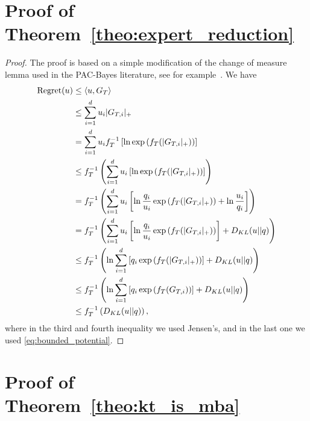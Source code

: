 \section{Proof of Theorem~\ref{theo:expert_reduction}}
\begin{proof}
The proof is based on a simple modification of the change of measure lemma used in the PAC-Bayes literature, see for example~\citet{McAllester13}.
We have
\begin{align*}
\operatorname{Regret}(u) 
& \leq \langle u, G_T \rangle \\
& \leq \sum_{i=1}^d u_i |G_{T,i}|_+ \\
& = \sum_{i=1}^d u_i f_T^{-1}\left[\ln \exp\left(f_T(|G_{T,i}|_+)\right)\right] \\
& \leq f_T^{-1}\left(\sum_{i=1}^d u_i \left[\ln \exp\left(f_T(|G_{T,i}|_+)\right)\right]\right) \\
& = f_T^{-1}\left(\sum_{i=1}^d u_i \left[\ln \frac{q_i}{u_i}\exp\left(f_T(|G_{T,i}|_+)\right)+ \ln\frac{u_i}{q_i}\right]\right) \\
& = f_T^{-1}\left(\sum_{i=1}^d u_i \left[\ln \frac{q_i}{u_i}\exp\left(f_T(|G_{T,i}|_+)\right)\right] + D_{KL}(u||q)\right) \\
& \leq f_T^{-1}\left(\ln \sum_{i=1}^d \left[q_i \exp\left(f_T(|G_{T,i}|_+)\right)\right] + D_{KL}(u||q)\right) \\
& \leq f_T^{-1}\left(\ln \sum_{i=1}^d \left[q_i \exp\left(f_T(G_{T,i})\right)\right] + D_{KL}(u||q)\right) \\
& \leq f_T^{-1}\left(D_{KL}(u||q)\right),
\end{align*}
where in the third and fourth inequality we used Jensen's, and in the last one
we used \eqref{eq:bounded_potential}.
\end{proof}

\section{Proof of Theorem~\ref{theo:kt_is_mba}}

